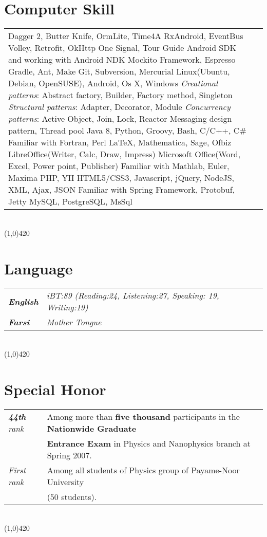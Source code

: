 \documentclass[10pt]{article}
\newcommand\HRule{\hspace*{.8cm}\line(1,0){420}\\}
\newenvironment{Record}[1]
{
    \vspace{-0.35cm}
    \section*{#1}
        \vspace{0.1cm}
        \begin{tabular}
}
{
        \end{tabular}\\
        \HRule
}
\begin{document}
\begin{Record}{Computer Skill}{l l}
    \ComputerSkill{Android Library}
        {Dagger 2, Butter Knife, OrmLite, Time4A}
        {RxAndroid, EventBus}
        {Volley, Retrofit, OkHttp}
        {One Signal, Tour Guide}
        {Android SDK and working with Android NDK}%
    \ComputerSkill{Android Test Library}
        {Mockito Framework, Espresso}{}{}{}{}%
    \ComputerSkill{Build Tool}
        {Gradle, Ant, Make}{}{}{}{}%
    \ComputerSkill{Version control}
        {Git, Subversion, Mercurial}{}{}{}{}%
    \ComputerSkill{OS}
        {Linux(Ubuntu, Debian, OpenSUSE), Android, Os X, Windows}{}{}{}{}%
    \ComputerSkill{Software Design Pattern}
        {\textit{Creational patterns}: Abstract factory, Builder,}
        {\qquad Factory method, Singleton}
        {\textit{Structural patterns}: Adapter, Decorator, Module}
        {\textit{Concurrency patterns}: Active Object, Join, Lock, Reactor}
        {\qquad Messaging design pattern, Thread pool}%
    \ComputerSkill{Languages}
        {Java 8, Python, Groovy, Bash, C/C++, C\#}
        {Familiar with Fortran, Perl}{}{}{}%
    \ComputerSkill{Special Software}
        {\LaTeX, Mathematica, Sage, Ofbiz}
        {LibreOffice(Writer, Calc, Draw, Impress)}
        {Microsoft Office(Word, Excel, Power point, Publisher)}
        {Familiar with Mathlab, Euler, Maxima}{}%
    \ComputerSkill{Web Programming}
        {PHP, YII}
        {HTML5/CSS3, Javascript, jQuery, NodeJS, XML, Ajax, JSON}
        {Familiar with Spring Framework, Protobuf, Jetty}{}{}%
    \ComputerSkill{Sql}
        {MySQL, PostgreSQL, MsSql}{}{}{}{}%
\end{Record}


\newcommand{\Language}[2]{
    \textbf{\textsl{#1}}&\textit{#2}\\
}
\begin{Record}{Language}{l l}
    \Language{English}
        {iBT:89 (Reading:24, Listening:27, Speaking: 19, Writing:19)}%
    \Language{Farsi}{Mother Tongue}%
\end{Record}

\newcommand{\SpecialHonor}[3]{
    \textsl{ #1}&#2\\
    &#3\\
}
\begin{Record}{Special Honor}{l l}
    \SpecialHonor{\textbf{44th} rank}
        {Among more than \textbf{five thousand} participants in the \textbf{Nationwide Graduate}}
        {\textbf{Entrance Exam} in Physics and Nanophysics branch at Spring 2007.}%
    \SpecialHonor{First rank}
        {Among all students of Physics group of Payame-Noor University}
        {(50 students).}%
\end{Record}
\end{document}
